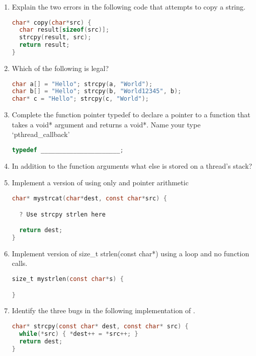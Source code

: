\begin{enumerate}
\item Explain the two errors in the following code that attempts to copy a string.

\begin{lstlisting}[language=C]
char* copy(char*src) {
  char result[sizeof(src)];
  strcpy(result, src);
  return result;
}
\end{lstlisting}

\item Which of the following is legal?

\begin{lstlisting}[language=C]
char a[] = "Hello"; strcpy(a, "World");
char b[] = "Hello"; strcpy(b, "World12345", b);
char* c = "Hello"; strcpy(c, "World");
\end{lstlisting}

\item Complete the function pointer typedef to declare a pointer to a function that takes a void* argument and returns a void*. Name your type `pthread\_callback'

\begin{lstlisting}[language=C]
typedef ______________________;
\end{lstlisting}

\item In addition to the function arguments what else is stored on a thread's stack?

\item Implement a version of  using only   and pointer arithmetic

\begin{lstlisting}[language=C]
char* mystrcat(char*dest, const char*src) {

  ? Use strcpy strlen here

  return dest;
}
\end{lstlisting}

\item Implement version of size\_t strlen(const char*) using a loop and no function calls.

\begin{lstlisting}[language=C]
size_t mystrlen(const char*s) {

}
\end{lstlisting}

\item Identify the three bugs in the following implementation of .

\begin{lstlisting}[language=C]
char* strcpy(const char* dest, const char* src) {
  while(*src) { *dest++ = *src++; }
  return dest;
}
\end{lstlisting}

\end{enumerate}

